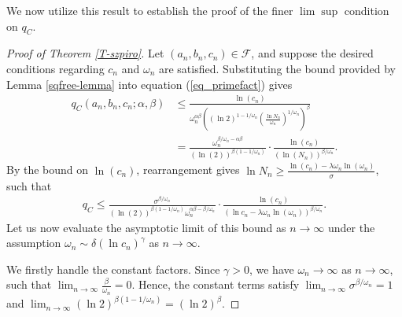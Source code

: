 \documentclass[11pt,letterpaper]{amsart}
\def\ra{\rightarrow}
\begin{document}
We now utilize this result to establish the proof of the finer $\lim\sup$ condition on $q_C$.

\begin{proof}[Proof of Theorem \ref{T-szpiro}]
Let $(a_n, b_n, c_n) \in \mathcal{F}$, and suppose the desired conditions regarding $c_n$ and $\omega_n$ are satisfied. Substituting the bound provided by Lemma \ref{sqfree-lemma} into equation (\ref{eq_primefact}) gives
\begin{align*}
    q_C(a_n, b_n, c_n; \alpha, \beta) &\leq \frac{\ln (c_n)}{\omega_n^{\alpha\beta} \left( (\ln 2)^{1 - 1/\omega_n} \left(\frac{\ln N_n}{\omega_n}\right)^{1/\omega_n} \right)^\beta}\\ & = \frac{\omega_n^{\beta/\omega_n - \alpha\beta}}{(\ln (2))^{\beta(1 - 1/\omega_n)}} \cdot \frac{\ln (c_n)}{(\ln (N_n))^{\beta/\omega_n}}.
\end{align*}
By the bound on $\ln(c_n)$, rearrangement gives $\ln N_n \ge \frac{\ln (c_n) - \lambda \omega_n \ln (\omega_n)}{\sigma}$, such that
\begin{align*}
    q_C \le \frac{\sigma^{\beta/\omega_n}}{(\ln (2))^{\beta(1 - 1/\omega_n)} \omega_n^{\alpha\beta - \beta/\omega_n}} \cdot \frac{\ln (c_n)}{(\ln c_n - \lambda \omega_n \ln (\omega_n))^{\beta/\omega_n}}.
\end{align*}
Let us now evaluate the asymptotic limit of this bound as $n \ra \infty$ under the assumption $\omega_n \sim \delta (\ln c_n)^\gamma$ as $n \to \infty$. 

We firstly handle the constant factors. Since $\gamma > 0$, we have $\omega_n \ra \infty$ as $n \ra \infty$, such that $\lim_{n \to \infty} \frac{\beta}{\omega_n} = 0$. Hence, the constant terms satisfy $\lim_{n \to \infty} \sigma^{\beta/\omega_n} = 1$ and $\lim_{n \to \infty} (\ln 2)^{\beta(1 - 1/\omega_n)} = (\ln 2)^\beta$.


\end{proof}
\end{document}
